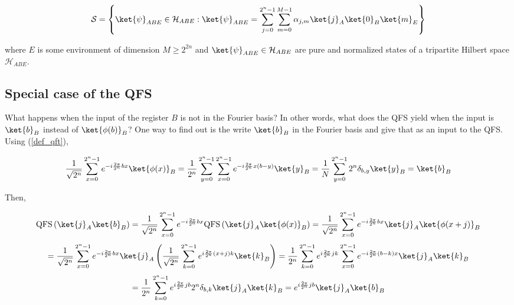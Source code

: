 \begin{equation}
    \mathcal{S} = \left\{\ket{\psi}_{ABE} \in \mathcal{H}_{ABE} : \ket{\psi}_{ABE} = \sum_{j=0}^{2^n -1}\sum_{m=0}^{M-1}\alpha_{j,m}\ket{j}_A\ket{0}_B\ket{m}_E\right\}
    \label{eq_s}
\end{equation}

where $E$ is some environment of dimension $M \geq 2^{2n}$ and $\ket{\psi}_{ABE} \in \mathcal{H}_{ABE}$ are pure and normalized states of a tripartite Hilbert space $\mathcal{H}_{ABE}$.

\subsection{Special case of the QFS}
What happens when the input of the register $B$ is not in the Fourier basis? In other words, what does the QFS yield when the input is $\ket{b}_B$ instead of $\ket{\phi(b)}_B$? One way to find out is the write $\ket{b}_B$ in the Fourier basis and give that as an input to the QFS. Using (\ref{def_qft}),

\begin{equation}
    \frac{1}{\sqrt{2^n}}\sum_{x=0}^{2^n-1}e^{-i\frac{2\pi}{2^n}bx}\ket{\phi(x)}_B = \frac{1}{2^n}\sum_{y=0}^{2^n-1}\sum_{x=0}^{2^n-1}e^{-i\frac{2\pi}{2^n}x(b-y)}\ket{y}_B = \frac{1}{N}\sum_{y=0}^{2^n-1}2^n\delta_{b,y}\ket{y}_B = \ket{b}_B
    \label{eq_b_fourier_basis}
\end{equation}

Then,

\begin{equation*}
    \text{QFS}\left(\ket{j}_A\ket{b}_B\right) = \frac{1}{\sqrt{2^n}}\sum_{x=0}^{2^n-1}e^{-i\frac{2\pi}{2^n}bx}\text{QFS}\left(\ket{j}_A\ket{\phi(x)}_B\right) = \frac{1}{\sqrt{2^n}}\sum_{x=0}^{2^n-1}e^{-i\frac{2\pi}{2^n}bx}\ket{j}_A\ket{\phi(x+j)}_B
\end{equation*}
\begin{equation*}
    = \frac{1}{\sqrt{2^n}}\sum_{x=0}^{2^n-1}e^{-i\frac{2\pi}{2^n}bx}\ket{j}_A\left(\frac{1}{\sqrt{2^n}}\sum_{k=0}^{2^n-1}e^{i\frac{2\pi}{2^n}(x+j)k}\ket{k}_B\right) = \frac{1}{2^n}\sum_{k=0}^{2^n-1}e^{i\frac{2\pi}{2^n}jk}\sum_{x=0}^{2^n-1}e^{-i\frac{2\pi}{2^n}(b-k)x}\ket{j}_A\ket{k}_B
\end{equation*}
\begin{equation}
    = \frac{1}{2^n}\sum_{k=0}^{2^n-1}e^{i\frac{2\pi}{2^n}jb}2^n\delta_{b,k}\ket{j}_A\ket{k}_B = e^{i\frac{2\pi}{2^n}jb}\ket{j}_A\ket{b}_B
    \label{qfs_on_b}
\end{equation}





